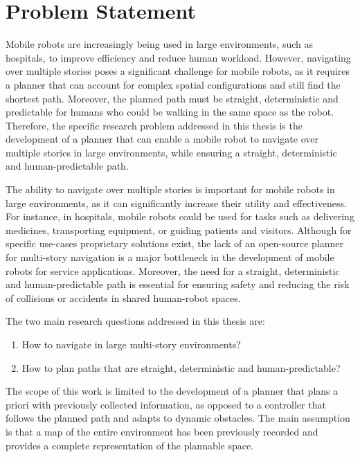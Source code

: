 \section{Problem Statement}
\label{sec:problem_statement}
Mobile robots are increasingly being used in large environments, such as hospitals, to improve efficiency and reduce human workload. However, navigating over multiple stories poses a significant challenge for mobile robots, as it requires a planner that can account for complex spatial configurations and still find the shortest path. Moreover, the planned path must be straight, deterministic and predictable for humans who could be walking in the same space as the robot. Therefore, the specific research problem addressed in this thesis is the development of a planner that can enable a mobile robot to navigate over multiple stories in large environments, while ensuring a straight, deterministic and human-predictable path. 

The ability to navigate over multiple stories is important for mobile robots in large environments, as it can significantly increase their utility and effectiveness. For instance, in hospitals, mobile robots could be used for tasks such as delivering medicines, transporting equipment, or guiding patients and visitors. Although for specific use-cases proprietary solutions exist, the lack of an open-source planner for multi-story navigation is a major bottleneck in the development of mobile robots for service applications. Moreover, the need for a straight, deterministic and human-predictable path is essential for ensuring safety and reducing the risk of collisions or accidents in shared human-robot spaces.

The two main research questions addressed in this thesis are:
\begin{enumerate}
    \item How to navigate in large multi-story environments?
    \item How to plan paths that are straight, deterministic and human-predictable?
\end{enumerate}

The scope of this work is limited to the development of a planner that plans a priori with previously collected information, as opposed to a controller that follows the planned path and adapts to dynamic obstacles. The main assumption is that a map of the entire environment has been previously recorded and provides a complete representation of the plannable space.

